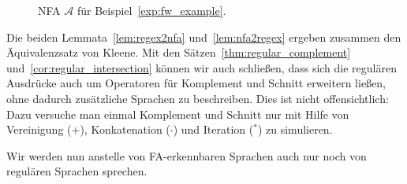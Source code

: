 \documentclass[11pt, a4paper]{article}
\theoremstyle{definition}
\theoremstyle{plain}
\numberwithin{equation}{section}
\begin{document}
\begin{figure}
	\centering
	
	\caption{NFA \( \mathcal{A} \) für Beispiel~\ref{exp:fw_example}.}
	\label{fig:fw_example}
\end{figure}
Die beiden Lemmata~\ref{lem:regex2nfa} und~\ref{lem:nfa2regex} ergeben zusammen den Äquivalenzsatz von Kleene. Mit den Sätzen~\ref{thm:regular_complement} und~\ref{cor:regular_intersection} können wir auch schließen, dass sich die regulären Ausdrücke auch um Operatoren für Komplement und Schnitt erweitern ließen, ohne dadurch zusätzliche Sprachen zu beschreiben. Dies ist nicht offensichtlich: Dazu versuche man einmal Komplement und Schnitt nur mit Hilfe von Vereinigung (\(+\)), Konkatenation (\(\cdot\)) und Iteration (\(^\ast\)) zu simulieren.\par
Wir werden nun anstelle von FA-erkennbaren Sprachen auch nur noch von regulären Sprachen sprechen.
\end{document}
